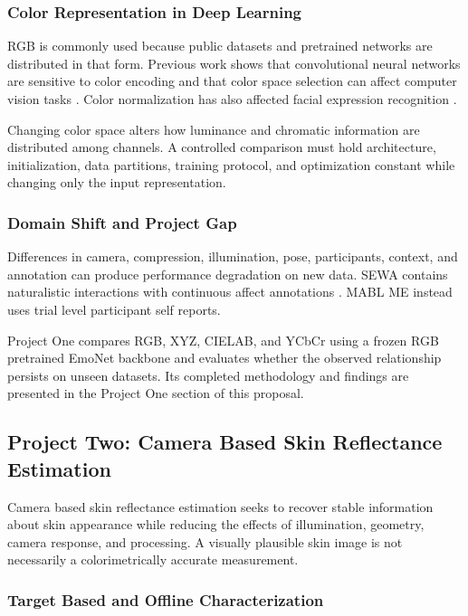 \documentclass[12pt]{article}
\begin{document}
\subsubsection{Color Representation in Deep Learning}

RGB is commonly used because public datasets and pretrained networks are distributed in that form. Previous work shows that convolutional neural networks are sensitive to color encoding and that color space selection can affect computer vision tasks \cite{singh2020assessing,gowda2018colornet}. Color normalization has also affected facial expression recognition \cite{nunnari2025color}.

Changing color space alters how luminance and chromatic information are distributed among channels. A controlled comparison must hold architecture, initialization, data partitions, training protocol, and optimization constant while changing only the input representation.

\subsubsection{Domain Shift and Project Gap}

Differences in camera, compression, illumination, pose, participants, context, and annotation can produce performance degradation on new data. SEWA contains naturalistic interactions with continuous affect annotations \cite{kossaifi2019}. MABL ME instead uses trial level participant self reports.

Project One compares RGB, XYZ, CIELAB, and YCbCr using a frozen RGB pretrained EmoNet backbone and evaluates whether the observed relationship persists on unseen datasets. Its completed methodology and findings are presented in the Project One section of this proposal.

\subsection{Project Two: Camera Based Skin Reflectance Estimation}

Camera based skin reflectance estimation seeks to recover stable information about skin appearance while reducing the effects of illumination, geometry, camera response, and processing. A visually plausible skin image is not necessarily a colorimetrically accurate measurement.

\subsubsection{Target Based and Offline Characterization}
\end{document}
